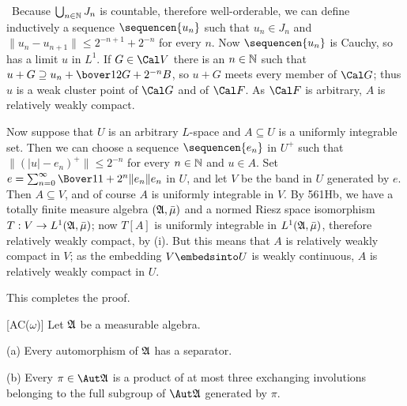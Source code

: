 {\qquad\grheade\ Because $\bigcup_{n\in\Bbb N}J_n$ is countable, therefore
well-orderable, we can define inductively a sequence $\sequencen{u_n}$ such
that $u_n\in J_n$ and $\|u_n-u_{n+1}\|\le 2^{-n+1}+2^{-n}$ for every $n$.
Now $\sequencen{u_n}$ is Cauchy, so has a limit $u$ in $L^1$.
If $G\in\Cal V$ there is an $n\in\Bbb N$ such that
$u+G\supseteq u_n+\bover12G+2^{-n}B$, so $u+G$ meets every member of
$\Cal G$;  thus $u$ is a weak cluster point of $\Cal G$ and of $\Cal F$.
As $\Cal F$ is arbitrary, $A$ is relatively weakly compact.

\medskip

 Now suppose that $U$ is an arbitrary $L$-space and
$A\subseteq U$ is a uniformly integrable set.   Then we can choose a
sequence $\sequencen{e_n}$ in $U^+$ such that
$\|(|u|-e_n)^+\|\le 2^{-n}$ for every $n\in\Bbb N$ and $u\in A$.   Set
$e=\sum_{n=0}^{\infty}\Bover1{1+2^n\|e_n\|}e_n$ in $U$, and let $V$ be the
band in $U$ generated by $e$.   Then $A\subseteq V$, and of course $A$ is
uniformly integrable in $V$.   By 561Hb, we have a
totally finite measure algebra $(\frak A,\bar\mu)$ and a normed Riesz space
isomorphism $T:V\to L^1(\frak A,\bar\mu)$;   now $T[A]$ is uniformly
integrable in $L^1(\frak A,\bar\mu)$, therefore relatively weakly
compact, by (i).   But this means that $A$ is relatively weakly compact in
$V$;  as the embedding $V\embedsinto U$ is weakly continuous, $A$ is
relatively weakly compact in $U$.

This completes the proof.
}%

 [AC($\omega$)] Let $\frak A$ be a measurable algebra.

(a) Every automorphism of $\frak A$ has a separator.

(b) Every $\pi\in\Aut\frak A$ is a product of at most three exchanging
involutions belonging to the full subgroup of $\Aut\frak A$ generated by
$\pi$.

